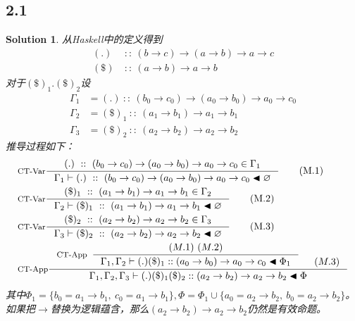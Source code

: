 \documentclass[11pt, a4paper]{article}
\newtheorem{Solution}{Solution}
\let\emptyset\varnothing
\begin{document}
    \subsection*{2.1}
    \begin{Solution} 从Haskell中的定义得到
        \begin{align*}
            (.)~&::~(b\rightarrow c)\rightarrow (a\rightarrow b)\rightarrow a\rightarrow c \\
            (\$)~&::~(a\rightarrow b)\rightarrow a \rightarrow b
        \end{align*}
        对于$(\$)_1.(\$)_2$设
        \begin{align*}
            \Gamma_1 &= (.)~::~(b_0\rightarrow c_0)\rightarrow (a_0\rightarrow b_0)\rightarrow a_0\rightarrow c_0 \\
            \Gamma_2 &= (\$)_1~::~(a_1\rightarrow b_1)\rightarrow a_1 \rightarrow b_1 \\
            \Gamma_3 &= (\$)_2~::~(a_2\rightarrow b_2)\rightarrow a_2 \rightarrow b_2
        \end{align*}
        推导过程如下：
        \begin{align}
            &\inference[CT-Var]{(.)~::~(b_0\rightarrow c_0)\rightarrow (a_0\rightarrow b_0)\rightarrow a_0\rightarrow c_0 \in \Gamma_1}{\Gamma_1 \vdash (.)~::~(b_0\rightarrow c_0)\rightarrow (a_0\rightarrow b_0)\rightarrow a_0\rightarrow c_0 \blacktriangleleft \emptyset} \tag{M.1} \\
            &\inference[CT-Var]{(\$)_1~::~(a_1\rightarrow b_1)\rightarrow a_1 \rightarrow b_1 \in \Gamma_2}{\Gamma_2 \vdash (\$)_1~::~(a_1\rightarrow b_1)\rightarrow a_1 \rightarrow b_1 \blacktriangleleft \emptyset} \tag{M.2} \\
            &\inference[CT-Var]{(\$)_2~::~(a_2\rightarrow b_2)\rightarrow a_2 \rightarrow b_2 \in \Gamma_3}{\Gamma_3 \vdash (\$)_2~::~(a_2\rightarrow b_2)\rightarrow a_2 \rightarrow b_2 \blacktriangleleft \emptyset} \tag{M.3} \\
            &\inference[CT-App]{\inference[CT-App]{(M.1)~(M.2)}{\Gamma_1, \Gamma_2 \vdash (.)(\$)_1 :: (a_0\rightarrow b_0)\rightarrow a_0 \rightarrow c_0 \blacktriangleleft \Phi_1} & (M.3)}{\Gamma_1, \Gamma_2, \Gamma_3 \vdash (.) (\$)_1 (\$)_2 :: (a_2\rightarrow b_2)\rightarrow a_2 \rightarrow b_2 \blacktriangleleft \Phi} \notag
        \end{align}
        其中$\Phi_1=\{b_0=a_1\rightarrow b_1,~c_0=a_1\rightarrow b_1\},\Phi=\Phi_1 \cup \{a_0=a_2\rightarrow b_2,~b_0=a_2\rightarrow b_2\}$。如果把$\rightarrow$替换为逻辑蕴含，那么$(a_2\rightarrow b_2)\rightarrow a_2 \rightarrow b_2$仍然是有效命题。
    \end{Solution}
\end{document}
